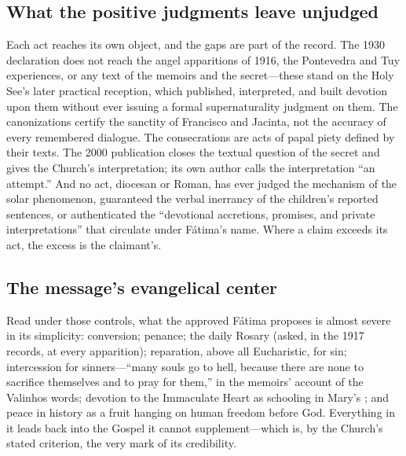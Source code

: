 \subsection{What the positive judgments leave unjudged}

Each act reaches its own object, and the gaps are part of the record.
The 1930 declaration does not reach the angel apparitions of 1916,
the Pontevedra and Tuy experiences, or any text of the memoirs and
the secret---these stand on the Holy See's later practical reception,
which published, interpreted, and built devotion upon them without
ever issuing a formal supernaturality judgment on them. The
canonizations certify the sanctity of Francisco and Jacinta, not the
accuracy of every remembered dialogue. The consecrations are acts of
papal piety defined by their texts. The 2000 publication closes the
textual question of the secret and gives the Church's interpretation;
its own author calls the interpretation ``an attempt.'' And no act,
diocesan or Roman, has ever judged the mechanism of the solar
phenomenon, guaranteed the verbal inerrancy of the children's
reported sentences, or authenticated the ``devotional accretions,
promises, and private interpretations'' that circulate under
F\'atima's name. Where a claim exceeds its act, the excess is the
claimant's.

\subsection{The message's evangelical center}

Read under those controls, what the approved F\'atima proposes is
almost severe in its simplicity: conversion; penance; the daily
Rosary (asked, in the 1917 records, at every apparition); reparation,
above all Eucharistic, for sin; intercession for sinners---``many
souls go to hell, because there are none to sacrifice themselves and
to pray for them,'' in the memoirs' account of the Valinhos words;
devotion to the Immaculate Heart as schooling in Mary's
; and peace in history as a fruit hanging on human
freedom before God. Everything in it leads back into the Gospel it
cannot supplement---which is, by the Church's stated criterion, the
very mark of its credibility.
